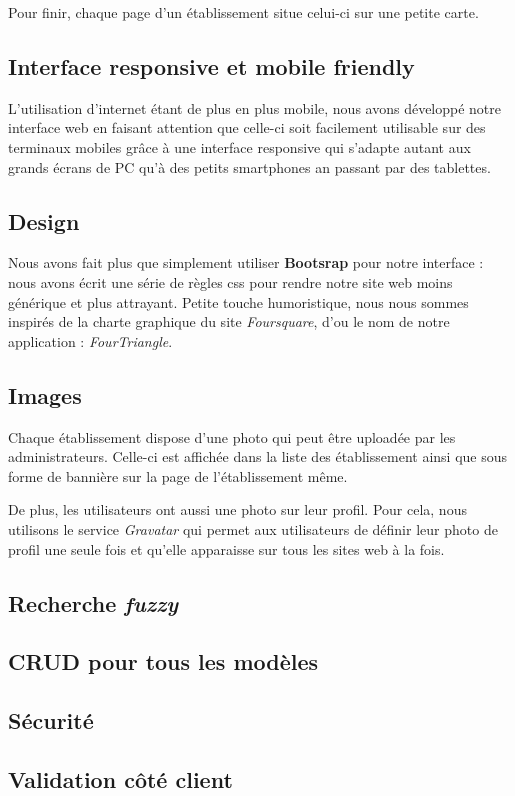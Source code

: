 \documentclass[10pt,a4paper]{article}
\begin{document}
Pour finir, chaque page d'un établissement situe celui-ci sur une petite carte.

\subsection{Interface responsive et mobile friendly}

L'utilisation d'internet étant de plus en plus mobile, nous avons développé notre interface web en faisant attention que celle-ci soit facilement utilisable sur des terminaux mobiles grâce à une interface responsive qui s'adapte autant aux grands écrans de PC qu'à des petits smartphones an passant par des tablettes.

\subsection{Design}

Nous avons fait plus que simplement utiliser \textbf{Bootsrap} pour notre interface : nous avons écrit une série de règles css pour rendre notre site web moins générique et plus attrayant. Petite touche humoristique, nous nous sommes inspirés de la charte graphique du site \textit{Foursquare}, d'ou le nom de notre application : \textit{FourTriangle}.

\subsection{Images}

Chaque établissement dispose d'une photo qui peut être uploadée par les administrateurs. Celle-ci est affichée dans la liste des établissement ainsi que sous forme de bannière sur la page de l'établissement même.

De plus, les utilisateurs ont aussi une photo sur leur profil. Pour cela, nous utilisons le service \textit{Gravatar} qui permet aux utilisateurs de définir leur photo de profil une seule fois et qu'elle apparaisse sur tous les sites web à la fois.

\subsection{Recherche \textit{fuzzy}}

\subsection{CRUD pour tous les modèles}


\subsection{Sécurité}

\subsection{Validation côté client}
\end{document}
